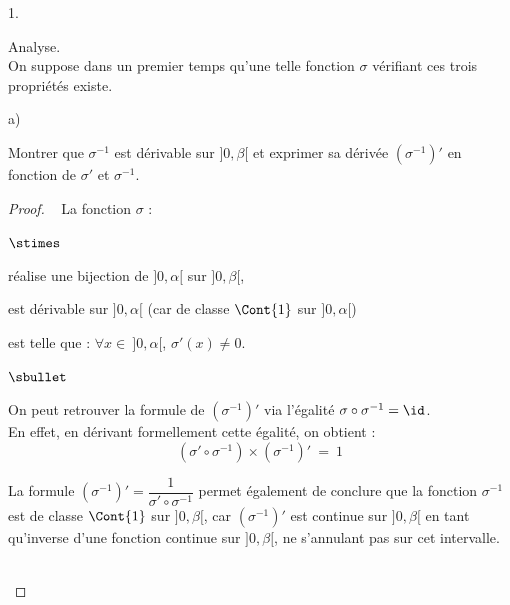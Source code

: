 \documentclass[11pt]{article}%
\begin{document}
\begin{noliste}{1.}
  \setlength{\itemsep}{4mm}
  \setcounter{enumi}{5}
  \item Analyse.\\
  On suppose dans un premier temps qu'une telle fonction $\sigma$ 
  vérifiant ces trois propriétés existe.
  \begin{noliste}{a)}
    \setlength{\itemsep}{2mm}
    \item Montrer que $\sigma^{-1}$ est dérivable sur $]0,\beta[$ et 
    exprimer sa dérivée $(\sigma^{-1})'$ en fonction de $\sigma'$
    et $\sigma^{-1}$.
    
    \begin{proof}~
      La fonction $\sigma$ :
      \begin{noliste}{$\stimes$}
	\item réalise une bijection de $]0,\alpha[$ sur $]0,\beta[$,
	\item est dérivable sur $]0,\alpha[$ (car de classe $\Cont{1}$ 
	sur $]0,\alpha[$)
	\item est telle que : $\forall x \in \ ]0,\alpha[$, 
	$\sigma'(x) \neq 0$.
      \end{noliste}
      \conc{Alors $\sigma^{-1}$ est dérivable sur $]0,\beta[$ et 
      $(\sigma^{-1})' = \dfrac{1}{\sigma' \circ \sigma^{-1}}$.}
      
      \begin{remark}
        \begin{noliste}{$\sbullet$}
	  \item On peut retrouver la formule de $(\sigma^{-1})'$
	  via l'égalité $\sigma \circ \sigma^{-1} = \id$.\\
	  En effet, en dérivant formellement cette égalité, on 
	  obtient :
	  \[
	    (\sigma' \circ \sigma^{-1}) \times (\sigma^{-1})' \ = \
	    1
	  \]
	  
	  \item La formule $(\sigma^{-1})' = \dfrac{1}{\sigma' \circ 
	  \sigma^{-1}}$ permet également de conclure que la 
	  fonction $\sigma^{-1}$ est de classe $\Cont{1}$ sur 
	  $]0,\beta[$, car $(\sigma^{-1})'$ est continue sur 
	  $]0,\beta[$ en tant qu'inverse d'une fonction continue
	  sur $]0,\beta[$, ne s'annulant pas sur cet 
	  intervalle.
        \end{noliste}
      \end{remark}~\\[-1.4cm]
    \end{proof}
    
    
    \newpage


\end{noliste}
\end{noliste}
\end{document}
